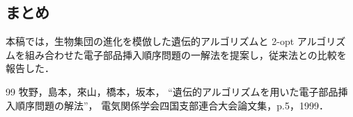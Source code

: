 \documentclass[a4j]{jarticle}
\begin{document}
\begin{Abstract}
 \section{まとめ}
 本稿では，生物集団の進化を模倣した遺伝的アルゴリズムと 2-opt アルゴリズ
 ムを組み合わせた電子部品挿入順序問題の一解法を提案し，従来法との比較を
 報告した．
 
\begin{thebibliography}{99}
  牧野，島本，來山，橋本，坂本，
		 ``遺伝的アルゴリズムを用いた電子部品挿入順序問題の解法''，
		 電気関係学会四国支部連合大会論文集，p.5，1999．
\end{thebibliography}

\end{Abstract}
\end{document}
